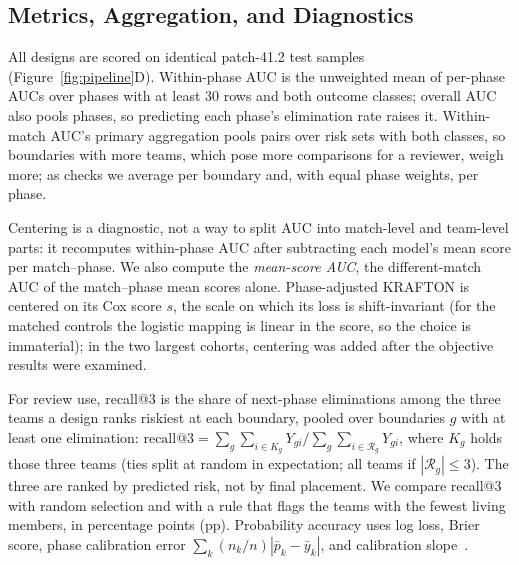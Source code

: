 \documentclass[sigconf,anonymous]{acmart}
\begin{document}
\subsection{Metrics, Aggregation, and Diagnostics}
\label{sec:method:units}
All designs are scored on identical patch-41.2 test samples (Figure~\ref{fig:pipeline}D). Within-phase AUC is the unweighted mean of per-phase AUCs over phases with at least 30 rows and both outcome classes; overall AUC also pools phases, so predicting each phase's elimination rate raises it. Within-match AUC's primary aggregation pools pairs over risk sets with both classes, so boundaries with more teams, which pose more comparisons for a reviewer, weigh more; as checks we average per boundary and, with equal phase weights, per phase.

Centering is a diagnostic, not a way to split AUC into match-level and team-level parts: it recomputes within-phase AUC after subtracting each model's mean score per match--phase. We also compute the \emph{mean-score AUC}, the different-match AUC of the match--phase mean scores alone. Phase-adjusted KRAFTON is centered on its Cox score $s$, the scale on which its loss is shift-invariant (for the matched controls the logistic mapping is linear in the score, so the choice is immaterial); in the two largest cohorts, centering was added after the objective results were examined.

For review use, recall@3 is the share of next-phase eliminations among the three teams a design ranks riskiest at each boundary, pooled over boundaries $g$ with at least one elimination: $\mathrm{recall@3}=\sum_g\sum_{i\in K_g}Y_{gi}\big/\sum_g\sum_{i\in\mathcal{R}_g}Y_{gi}$, where $K_g$ holds those three teams (ties split at random in expectation; all teams if $|\mathcal{R}_g|\le3$). The three are ranked by predicted risk, not by final placement. We compare recall@3 with random selection and with a rule that flags the teams with the fewest living members, in percentage points (pp). Probability accuracy uses log loss, Brier score, phase calibration error $\sum_k(n_k/n)|\bar p_k-\bar y_k|$, and calibration slope~\cite{VanCalster16}.
\end{document}
